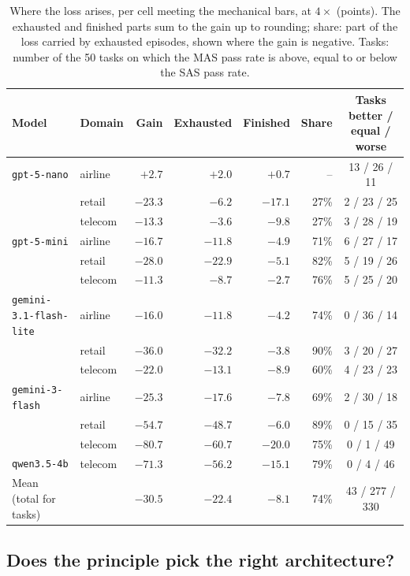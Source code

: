 \begin{table}[tbp]
\caption{Where the loss arises, per cell meeting the mechanical bars, at $4\times$ (points). The exhausted and finished parts sum to the gain up to rounding; share: part of the loss carried by exhausted episodes, shown where the gain is negative. Tasks: number of the 50 tasks on which the MAS pass rate is above, equal to or below the SAS pass rate.}
\label{tab:loss}
\begin{center}
\scriptsize
\begin{tabular}{@{}llrrrrc@{}}
\toprule
Model & Domain & Gain & Exhausted & Finished & Share & Tasks better / equal / worse \\
\midrule
\texttt{gpt-5-nano} & airline & $+2.7$ & $+2.0$ & $+0.7$ & -- & 13 / 26 / 11 \\
 & retail & $-23.3$ & $-6.2$ & $-17.1$ & 27\% & 2 / 23 / 25 \\
 & telecom & $-13.3$ & $-3.6$ & $-9.8$ & 27\% & 3 / 28 / 19 \\
\texttt{gpt-5-mini} & airline & $-16.7$ & $-11.8$ & $-4.9$ & 71\% & 6 / 27 / 17 \\
 & retail & $-28.0$ & $-22.9$ & $-5.1$ & 82\% & 5 / 19 / 26 \\
 & telecom & $-11.3$ & $-8.7$ & $-2.7$ & 76\% & 5 / 25 / 20 \\
\texttt{gemini-3.1-flash-lite} & airline & $-16.0$ & $-11.8$ & $-4.2$ & 74\% & 0 / 36 / 14 \\
 & retail & $-36.0$ & $-32.2$ & $-3.8$ & 90\% & 3 / 20 / 27 \\
 & telecom & $-22.0$ & $-13.1$ & $-8.9$ & 60\% & 4 / 23 / 23 \\
\texttt{gemini-3-flash} & airline & $-25.3$ & $-17.6$ & $-7.8$ & 69\% & 2 / 30 / 18 \\
 & retail & $-54.7$ & $-48.7$ & $-6.0$ & 89\% & 0 / 15 / 35 \\
 & telecom & $-80.7$ & $-60.7$ & $-20.0$ & 75\% & 0 / 1 / 49 \\
\texttt{qwen3.5-4b} & telecom & $-71.3$ & $-56.2$ & $-15.1$ & 79\% & 0 / 4 / 46 \\
\midrule
Mean (total for tasks) & & $-30.5$ & $-22.4$ & $-8.1$ & 74\% & 43 / 277 / 330 \\
\bottomrule
\end{tabular}
\end{center}
\end{table}

\subsection{Does the principle pick the right architecture?}
\label{sec:transfer}

